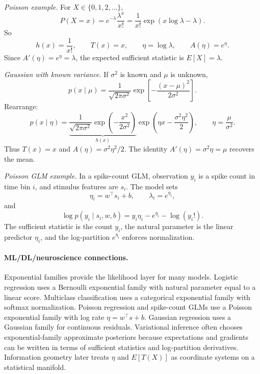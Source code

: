 \emph{Poisson example.} For \(X\in\{0,1,2,\ldots\}\),
\[
P(X=x)=e^{-\lambda}\frac{\lambda^x}{x!}
=\frac{1}{x!}\exp(x\log\lambda-\lambda).
\]
So
\[
h(x)=\frac{1}{x!},\qquad T(x)=x,\qquad \eta=\log\lambda,\qquad A(\eta)=e^\eta.
\]
Since \(A'(\eta)=e^\eta=\lambda\), the expected sufficient statistic is \(E[X]=\lambda\).

\emph{Gaussian with known variance.} If \(\sigma^2\) is known and \(\mu\) is unknown,
\[
p(x\mid\mu)
=\frac{1}{\sqrt{2\pi\sigma^2}}
\exp\!\left[-\frac{(x-\mu)^2}{2\sigma^2}\right].
\]
Rearrange:
\[
p(x\mid\eta)
=
\underbrace{\frac{1}{\sqrt{2\pi\sigma^2}}\exp\!\left(-\frac{x^2}{2\sigma^2}\right)}_{h(x)}
\exp\!\left(\eta x-\frac{\sigma^2\eta^2}{2}\right),
\qquad
\eta=\frac{\mu}{\sigma^2}.
\]
Thus \(T(x)=x\) and \(A(\eta)=\sigma^2\eta^2/2\). The identity \(A'(\eta)=\sigma^2\eta=\mu\) recovers the mean.

\emph{Poisson GLM example.} In a spike-count GLM, observation \(y_i\) is a spike count in time bin \(i\), and stimulus features are \(s_i\). The model sets
\[
\eta_i=w^\top s_i+b,\qquad
\lambda_i=e^{\eta_i},
\]
and
\[
\log p(y_i\mid s_i,w,b)
=y_i\eta_i-e^{\eta_i}-\log(y_i!).
\]
The sufficient statistic is the count \(y_i\), the natural parameter is the linear predictor \(\eta_i\), and the log-partition \(e^{\eta_i}\) enforces normalization.

\paragraph{ML/DL/neuroscience connections.}
Exponential families provide the likelihood layer for many models. Logistic regression uses a Bernoulli exponential family with natural parameter equal to a linear score. Multiclass classification uses a categorical exponential family with softmax normalization. Poisson regression and spike-count GLMs use a Poisson exponential family with log rate \(\eta=w^\top s+b\). Gaussian regression uses a Gaussian family for continuous residuals. Variational inference often chooses exponential-family approximate posteriors because expectations and gradients can be written in terms of sufficient statistics and log-partition derivatives. Information geometry later treats \(\eta\) and \(E[T(X)]\) as coordinate systems on a statistical manifold.

